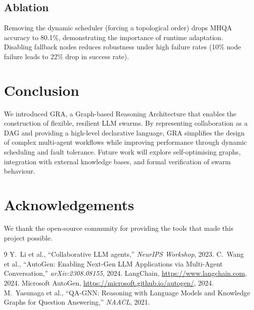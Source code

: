 \documentclass[11pt]{article}
\begin{document}
\subsection{Ablation}
Removing the dynamic scheduler (forcing a topological order) drops MHQA accuracy to 80.1\%, demonstrating the importance of runtime adaptation. 
Disabling fallback nodes reduces robustness under high failure rates (10\% node failure leads to 22\% drop in success rate).

\section{Conclusion}
We introduced GRA, a Graph-based Reasoning Architecture that enables the construction of flexible, resilient LLM swarms. 
By representing collaboration as a DAG and providing a high-level declarative language, GRA simplifies the design of complex multi-agent workflows while improving performance through dynamic scheduling and fault tolerance. 
Future work will explore self-optimising graphs, integration with external knowledge bases, and formal verification of swarm behaviour.

\section*{Acknowledgements}
We thank the open-source community for providing the tools that made this project possible.


\begin{thebibliography}{9}
Y.~Li et al., ``Collaborative LLM agents,'' \textit{NeurIPS Workshop}, 2023.
C.~Wang et al., ``AutoGen: Enabling Next-Gen LLM Applications via Multi-Agent Conversation,'' \textit{arXiv:2308.08155}, 2024.
LangChain, \url{https://www.langchain.com}, 2024.
Microsoft AutoGen, \url{https://microsoft.github.io/autogen/}, 2024.
M.~Yasunaga et al., ``QA-GNN: Reasoning with Language Models and Knowledge Graphs for Question Answering,'' \textit{NAACL}, 2021.
\end{thebibliography}
\end{document}
